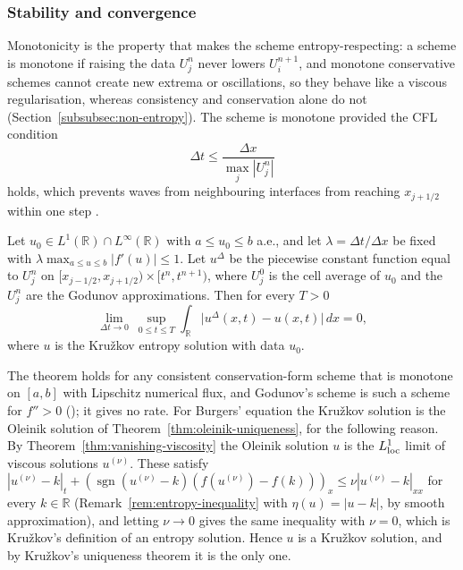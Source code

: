 \subsubsection{Stability and convergence}
\label{subsubsec:godunov-convergence}

Monotonicity is the property that makes the scheme entropy-respecting: a scheme is
monotone if raising the data $U_j^n$ never lowers $U_i^{n+1}$, and monotone
conservative schemes cannot create new extrema or oscillations, so they behave like
a viscous regularisation, whereas consistency and conservation alone do not
(Section~\ref{subsubsec:non-entropy}). The scheme is monotone provided the CFL
condition
\begin{equation}
  \label{eq:cfl}
  \Delta t \le \frac{\Delta x}{\max_j |U_j^n|}
\end{equation}
holds, which prevents waves from neighbouring interfaces from reaching
$x_{j+1/2}$ within one step \cite[Ch.~4]{leveque2002}.

\begin{theorem}
\label{thm:godunov-convergence}
Let $u_0\in L^1(\mathbb{R})\cap L^\infty(\mathbb{R})$ with $a\le u_0\le b$ a.e.,
and let $\lambda=\Delta t/\Delta x$ be fixed with
$\lambda\max_{a\le u\le b}|f'(u)|\le1$. Let $u^{\Delta}$ be the piecewise
constant function equal to $U_j^n$ on $[x_{j-1/2},x_{j+1/2})\times[t^n,t^{n+1})$,
where $U_j^0$ is the cell average of $u_0$ and the $U_j^n$ are the Godunov
approximations. Then for every $T>0$
\begin{equation*}
  \lim_{\Delta t\to0}\ \sup_{0\le t\le T}\int_{\mathbb{R}}\big|u^{\Delta}(x,t)-u(x,t)\big|\,dx=0,
\end{equation*}
where $u$ is the Kru\v{z}kov entropy solution \cite{kruzhkov1970} with data $u_0$.
\end{theorem}

The theorem holds for any consistent conservation-form scheme that is monotone on
$[a,b]$ with Lipschitz numerical flux, and Godunov's scheme is such a scheme for
$f''>0$ (\cite[\S1]{crandall1980}); it gives no rate. For Burgers' equation the
Kru\v{z}kov solution is the Oleinik solution of
Theorem~\ref{thm:oleinik-uniqueness}, for the following reason. By
Theorem~\ref{thm:vanishing-viscosity} the Oleinik solution $u$ is the $L^1_{\rm loc}$
limit of viscous solutions $u^{(\nu)}$. These satisfy
$|u^{(\nu)}-k|_t+(\operatorname{sgn}(u^{(\nu)}-k)(f(u^{(\nu)})-f(k)))_x\le\nu|u^{(\nu)}-k|_{xx}$
for every $k\in\mathbb{R}$ (Remark~\ref{rem:entropy-inequality} with $\eta(u)=|u-k|$,
by smooth approximation), and letting $\nu\to0$ gives the same inequality with
$\nu=0$, which is Kru\v{z}kov's definition of an entropy solution. Hence $u$ is a
Kru\v{z}kov solution, and by Kru\v{z}kov's uniqueness theorem \cite{kruzhkov1970} it is the
only one.

